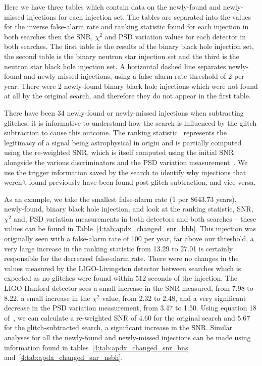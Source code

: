 Here we have three tables which contain data on the newly-found and newly-missed injections for each injection set. The tables are separated into the values for the inverse false-alarm rate and ranking statistic found for each injection in both searches then the SNR, $\chi^{2}$ and PSD variation values for each detector in both searches. The first table is the results of the binary black hole injection set, the second table is the binary neutron star injection set and the third is the neutron star black hole injection set. A horizontal dashed line separates newly-found and newly-missed injections, using a false-alarm rate threshold of 2 per year. There were 2 newly-found binary black hole injections which were not found at all by the original search, and therefore they do not appear in the first table.

There have been 34 newly-found or newly-missed \gwadj injections when subtracting \scladj glitches, it is informative to understand how the \gwadj search is influenced by the glitch subtraction to cause this outcome. The ranking statistic~\cite{PyCBC_global:2020} represents the legitimacy of a signal being astrophysical in origin and is partially computed using the re-weighted SNR, which is itself computed using the initial SNR alongside the various \gwadj discriminators and the PSD variation measurement~\cite{PSD_var:2020}. We use the trigger information saved by the \gwadj search to identify why injections that weren't found previously have been found post-glitch subtraction, and vice versa. 

As an example, we take the smallest false-alarm rate (1 per $8643.73$ years), newly-found, binary black hole injection, and look at the ranking statistic, SNR, $\chi^{2}$ and, PSD variation measurements in both detectors and both searches -- these values can be found in Table~\ref{4:tab:apdx_changed_snr_bbh}. This injection was originally seen with a false-alarm rate of 100 per year, far above our threshold, a very large increase in the ranking statistic from 13.29 to 27.01 is certainly responsible for the decreased false-alarm rate. There were no changes in the values measured by the LIGO-Livingston detector between searches which is expected as no \scladj glitches were found within $512$ seconds of the injection. The LIGO-Hanford detector sees a small increase in the SNR measured, from 7.98 to 8.22, a small increase in the $\chi^{2}$ value, from 2.32 to 2.48, and a very significant decrease in the PSD variation measurement, from 3.47 to 1.50. Using equation 18 of~\cite{PSD_var:2020}, we can calculate a re-weighted SNR of $4.60$ for the original search and $5.67$ for the glitch-subtracted search, a significant increase in the SNR. Similar analyses for all the newly-found and newly-missed injections can be made using information found in tables~\ref{4:tab:apdx_changed_snr_bns} and~\ref{4:tab:apdx_changed_snr_nsbh}.

